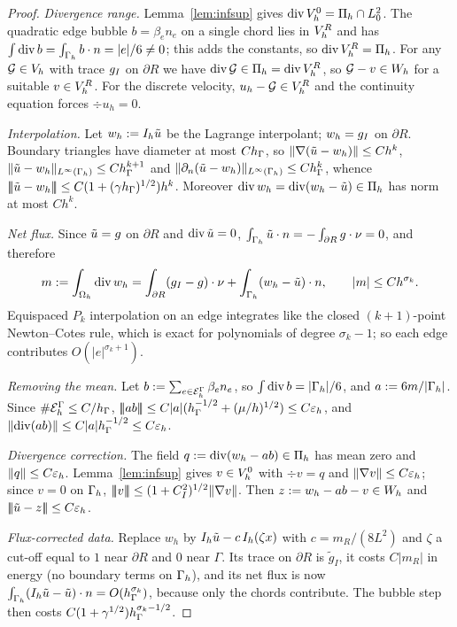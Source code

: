 \begin{proof}
\emph{Divergence range.} Lemma~\ref{lem:infsup} gives $\operatorname{div}V_h^0=\Pi_h\cap L^2_0$. The quadratic edge bubble $b=\beta_en_e$ on a single chord lies in $V_h^R$ and has $\int\operatorname{div} b=\int_{\Gamma_h}b\cdot n=|e|/6\ne0$; this adds the constants, so $\operatorname{div}V_h^R=\Pi_h$. For any $\mathcal G\in V_h$ with trace $g_I$ on $\partial R$ we have $\operatorname{div}\mathcal G\in\Pi_h=\operatorname{div}V_h^R$, so $\mathcal G-v\in W_h$ for a suitable $v\in V_h^R$. For the discrete velocity, $u_h-\mathcal G\in V_h^R$ and the continuity equation forces $\div u_h=0$.

\emph{Interpolation.} Let $w_h:=I_h\tilde u$ be the Lagrange interpolant; $w_h=g_I$ on $\partial R$. Boundary triangles have diameter at most $Ch_\Gamma$, so $\lVert \nabla(\tilde u-w_h)\rVert\le Ch^k$, $\lVert \tilde u-w_h\rVert_{L^\infty(\Gamma_h)}\le Ch_\Gamma^{k+1}$ and $\lVert \partial_n(\tilde u-w_h)\rVert_{L^\infty(\Gamma_h)}\le Ch_\Gamma^k$, whence $|\!|\!|\tilde u-w_h|\!|\!|\le C(1+(\gamma h_\Gamma)^{1/2})h^k$. Moreover $\operatorname{div} w_h=\operatorname{div}(w_h-\tilde u)\in\Pi_h$ has norm at most $Ch^k$.

\emph{Net flux.} Since $\tilde u=g$ on $\partial R$ and $\operatorname{div}\tilde u=0$, $\int_{\Gamma_h}\tilde u\cdot n=-\int_{\partial R}g\cdot\nu=0$, and therefore
\[
m:=\int_{\Omega_h}\operatorname{div} w_h=\int_{\partial R}(g_I-g)\cdot\nu+\int_{\Gamma_h}(w_h-\tilde u)\cdot n,\qquad |m|\le Ch^{\sigma_k}.
\]
Equispaced $P_k$ interpolation on an edge integrates like the closed $(k+1)$-point Newton--Cotes rule, which is exact for polynomials of degree $\sigma_k-1$; so each edge contributes $O(|e|^{\sigma_k+1})$.

\emph{Removing the mean.} Let $b:=\sum_{e\in\mathcal E_h^\Gamma}\beta_en_e$, so $\int\operatorname{div} b=|\Gamma_h|/6$, and $a:=6m/|\Gamma_h|$. Since $\#\mathcal E_h^\Gamma\le C/h_\Gamma$,
$|\!|\!|ab|\!|\!|\le C|a|(h_\Gamma^{-1/2}+(\mu/h)^{1/2})\le C\varepsilon_h$, and $\lVert \operatorname{div}(ab)\rVert\le C|a|h_\Gamma^{-1/2}\le C\varepsilon_h$.

\emph{Divergence correction.} The field $q:=\operatorname{div}(w_h-ab)\in\Pi_h$ has mean zero and $\lVert q\rVert\le C\varepsilon_h$. Lemma~\ref{lem:infsup} gives $v\in V_h^0$ with $\div v=q$ and $\lVert \nabla v\rVert\le C\varepsilon_h$; since $v=0$ on $\Gamma_h$, $|\!|\!|v|\!|\!|\le(1+C_I^2)^{1/2}\lVert \nabla v\rVert$. Then $z:=w_h-ab-v\in W_h$ and $|\!|\!|\tilde u-z|\!|\!|\le C\varepsilon_h$.

\emph{Flux-corrected data.} Replace $w_h$ by $I_h\tilde u-c\,I_h(\zeta x)$ with $c=m_R/(8L^2)$ and $\zeta$ a cut-off equal to $1$ near $\partial R$ and $0$ near $\Gamma$. Its trace on $\partial R$ is $\tilde g_I$, it costs $C|m_R|$ in energy (no boundary terms on $\Gamma_h$), and its net flux is now $\int_{\Gamma_h}(I_h\tilde u-\tilde u)\cdot n=O(h_\Gamma^{\sigma_k})$, because only the chords contribute. The bubble step then costs $C(1+\gamma^{1/2})h_\Gamma^{\sigma_k-1/2}$.
\end{proof}

